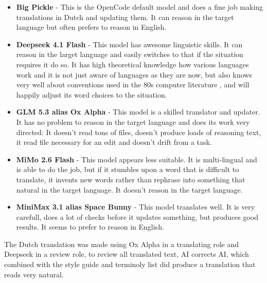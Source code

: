 \begin{itemize}
    \item {\bf Big Pickle} - This is the OpenCode default model and does a fine job making translations in Dutch and updating them. It can reason in the target language
    but often prefers to reason in English.
    \item {\bf Deepseek 4.1 Flash} - This model has awesome linguistic skills. It can reason in the larget language and easily switches to that if the situation requires it do so.
    It has high theoretical knowledge how various languages work and it is not just aware of languages as they are now, but also knows very well about conventions used
    in the 80s computer literature , and will happily adjust its word choices to the situation.
    \item {\bf GLM 5.3 alias Ox Alpha} - This model is a skilled translator and updater. It has no problem to reason in the target language and does its work very
    directed: It doesn't read tons of files, doesn't produce loads of reasoning text, it read file necessary for an edit and doesn't drift from a task.
    \item {\bf MiMo 2.6 Flash} - This model appears less suitable. It is multi-lingual and is able to do the job, but if it stumbles upon a word that is difficult to translate,
    it invents new words rather than rephrase into something that natural in the target language. It doesn't reason in the target language.
    \item {\bf MiniMax 3.1 alias Space Bunny} - This model translates well. It is very carefull, does a lot of checks before it updates something, but produces good results.
    It seems to prefer to reason in English.
\end{itemize}

The Dutch translation was made using Ox Alpha in a translating role and Deepseek in a review role, to review all translated text, AI corrects AI, which combined with
the style guide and terminoly list did produce a translation that reads very natural.



